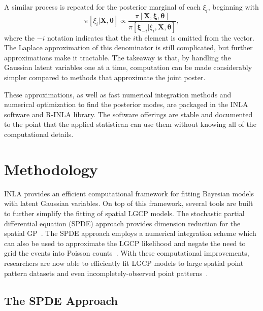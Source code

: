 \documentclass[]{interact}
\begin{document}
A similar process is repeated for the posterior marginal of each \(\xi_{i}\),
beginning with
\begin{displaymath}
\pi\left[\xi_{i} | \mathbf{X}, \boldsymbol{\theta}\right]
\propto \frac{\pi\left[\mathbf{X}, \boldsymbol{\xi}, \boldsymbol{\theta}\right]}
{\pi\left[\boldsymbol{\xi}_{-i} | \xi_{i}, \mathbf{X}, \boldsymbol{\theta}\right]},
\end{displaymath}
where the \(-i\) notation indicates that the \(i\)th element is omitted from
the vector. The Laplace approximation of this denominator is still complicated,
but further approximations make it tractable. The takeaway is that, by
handling the Gaussian latent variables one at a time, computation can be made
considerably simpler compared to methods that approximate the joint poster.

These approximations, as well as fast numerical integration methods and
numerical optimization to find the posterior modes, are packaged in the INLA
software and R-INLA library. The software offerings are stable and documented
to the point that the applied statistican can use them without knowing all of
the computational details.


\section{Methodology}
\label{methods}

INLA provides an efficient computational framework for fitting Bayesian models
with latent Gaussian variables. On top of this framework, several tools are
built to further simplify the fitting of spatial LGCP models. The stochastic
partial differential equation (SPDE) approach provides dimension reduction for
the spatial GP~\cite{lindgrenetal}. The SPDE approach employs a numerical
integration scheme which can also be used to approximate the LGCP likelihood
and negate the need to grid the events into Poisson counts~\cite{simpsonetal}.
With these computational improvements, researchers are now able to efficiently
fit LGCP models to large spatial point pattern datasets and even
incompletely-observed point patterns~\cite{yuanetal}.  


\subsection{The SPDE Approach}
\label{spde}
\end{document}
